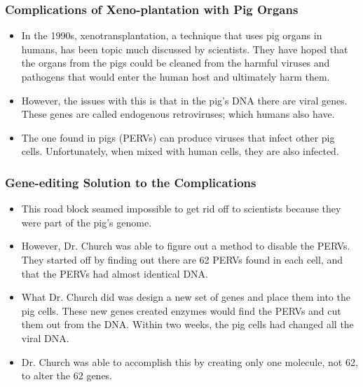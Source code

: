 \documentclass{beamer}
\begin{document}
\begin{frame}
\frametitle{Complications of Xeno-plantation with Pig Organs}
\begin{itemize}
\item
In the 1990s, xenotransplantation, a technique that uses pig organs in humans, has been topic much discussed by scientists. They have hoped that the organs from the pigs could be cleaned from the harmful viruses and pathogens that would enter the human host and ultimately harm them. 
\item
However, the issues with this is that in the pig’s DNA there are viral genes. These genes are called endogenous retroviruses; which humans also have. 
\item
The one found in pigs (PERVs) can produce viruses that infect other pig cells. Unfortunately, when mixed with human cells, they are also infected. 
\end{itemize}
\end{frame}


\begin{frame}
\frametitle{Gene-editing Solution to the Complications}
\begin{itemize}
\item
This road block seamed impossible to get rid off to scientists because they were part of the pig’s genome. 
\item
However, Dr. Church was able to figure out a method to disable the PERVs. They started off by finding out there are 62 PERVs found in each cell, and that the PERVs had almost identical DNA. 
\item
What Dr. Church did was design a new set of genes and place them into the pig cells. These new genes created enzymes would find the PERVs and cut them out from the DNA. Within two weeks, the pig cells had changed all the viral DNA. 
\item
Dr. Church was able to accomplish this by creating only one molecule, not 62, to alter the 62 genes.
\end{itemize}
\end{frame}
\end{document}
